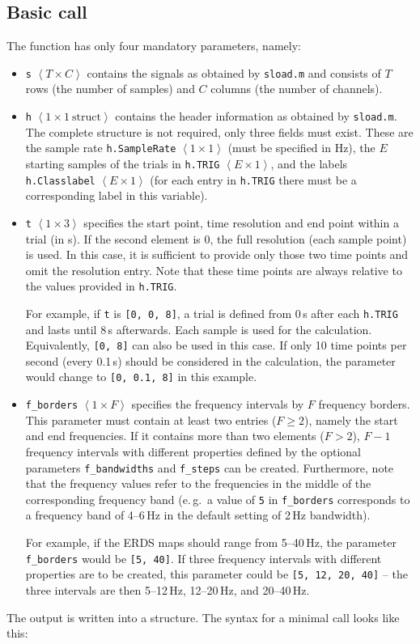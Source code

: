 \documentclass[12pt,a4paper]{article}
\begin{document}
\subsection{Basic call}
The function has only four mandatory parameters, namely:
\begin{itemize}
	\item \texttt{s} $\left< T \times C \right>$ contains the signals as obtained by \texttt{sload.m} and consists of $T$ rows (the number of samples) and $C$ columns (the number of channels).
    \item \texttt{h} $\left< 1 \times 1\ \mathrm{struct} \right>$ contains the header information as obtained by \texttt{sload.m}. The complete structure is not required, only three fields must exist. These are the sample rate \texttt{h.SampleRate} $\left< 1 \times 1 \right>$ (must be specified in Hz), the $E$ starting samples of the trials in \texttt{h.TRIG} $\left< E \times 1 \right>$, and the labels \texttt{h.Classlabel} $\left< E \times 1 \right>$ (for each entry in \texttt{h.TRIG} there must be a corresponding label in this variable).
    \item \texttt{t} $\left< 1 \times 3 \right>$ specifies the start point, time resolution and end point within a trial (in s). If the second element is 0, the full resolution (each sample point) is used. In this case, it is sufficient to provide only those two time points and omit the resolution entry. Note that these time points are always relative to the values provided in \texttt{h.TRIG}.
    
    For example, if \texttt{t} is \texttt{[0, 0, 8]}, a trial is defined from 0\,s after each \texttt{h.TRIG} and lasts until 8\,s afterwards. Each sample is used for the calculation. Equivalently, \texttt{[0, 8]} can also be used in this case. If only 10 time points per second (every 0.1\,s) should be considered in the calculation, the parameter would change to \texttt{[0, 0.1, 8]} in this example.
    \item \texttt{f\_borders} $\left< 1 \times F \right>$ specifies the frequency intervals by $F$ frequency borders. This parameter must contain at least two entries ($F\geq 2$), namely the start and end frequencies. If it contains more than two elements ($F>2$), $F-1$ frequency intervals with different properties defined by the optional parameters \texttt{f\_bandwidths} and \texttt{f\_steps} can be created. Furthermore, note that the frequency values refer to the frequencies in the middle of the corresponding frequency band (e.\,g.~a value of \texttt{5} in \texttt{f\_borders} corresponds to a frequency band of 4--6\,Hz in the default setting of 2\,Hz bandwidth).
    
    For example, if the ERDS maps should range from 5--40\,Hz, the parameter \texttt{f\_borders} would be \texttt{[5, 40]}. If three frequency intervals with different properties are to be created, this parameter could be \texttt{[5, 12, 20, 40]} -- the three intervals are then 5--12\,Hz, 12--20\,Hz, and 20--40\,Hz.
\end{itemize}
The output is written into a structure. The syntax for a minimal call looks like this:
\end{document}
